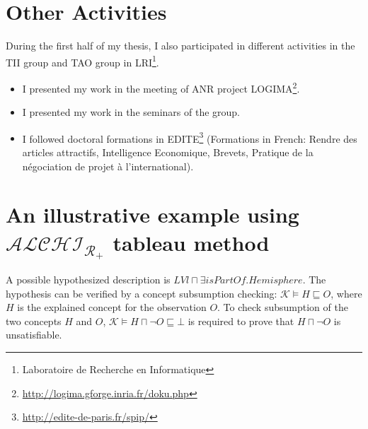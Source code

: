 \documentclass{article}
\begin{document}

\section{Other Activities}
During the first half of my thesis, I also participated in different activities in the TII group and TAO group 
in LRI\footnote{Laboratoire de Recherche en Informatique}.
\begin{itemize}
 \item I presented my work in the meeting of ANR project LOGIMA\footnote{\url{http://logima.gforge.inria.fr/doku.php}}.
 \item I presented my work in the seminars of the group.
 \item I followed doctoral formations in EDITE\footnote{\url{http://edite-de-paris.fr/spip/}}
 (Formations in French: Rendre des articles attractifs, Intelligence Economique, Brevets, Pratique de la négociation de projet à l'international).
\end{itemize}

\appendix
\section{An illustrative example using $\mathcal{ALCHI_{R_+}}$ tableau method}
\label{Appendix A}

A possible hypothesized description is $LVl\sqcap \exists isPartOf.Hemisphere$.
The hypothesis can be verified by a concept subsumption checking: $\mathcal{K} \vDash H\sqsubseteq O$, where $H$ is the explained concept for the observation $O$.
To check subsumption of the two concepts $H$ and $O$, $\mathcal{K} \vDash H\sqcap \neg O \sqsubseteq \bot$ is required to prove that $H\sqcap \neg O$ is unsatisfiable.
\end{document}
